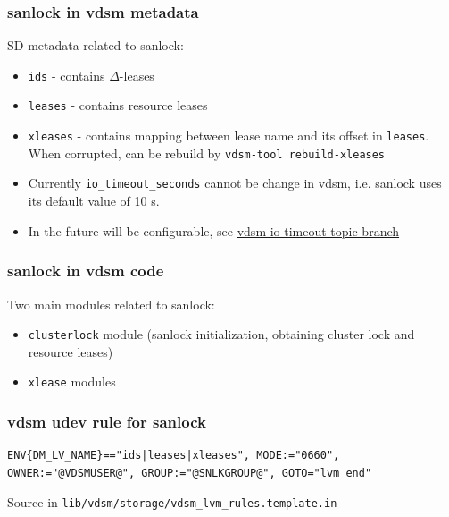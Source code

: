\documentclass[10pt,utf8]{beamer}
\begin{document}
\begin{frame}
    \frametitle{sanlock in vdsm metadata}
    SD metadata related to sanlock:
    \begin{itemize}
        \item \texttt{ids} - contains $\Delta$-leases
        \item \texttt{leases} - contains resource leases
        \item \texttt{xleases} - contains mapping between lease name and its offset in \texttt{leases}. When corrupted, can be rebuild by \texttt{vdsm-tool rebuild-xleases}
        \item Currently \texttt{io\_timeout\_seconds} cannot be change in vdsm, i.e. sanlock uses its default value of 10 s.
        \item In the future will be configurable, see \color{blue}\href{https://gerrit.ovirt.org/\#/q/project:vdsm+branch:master+topic:io-timeout}{vdsm io-timeout topic branch}\color{black}
    \end{itemize}
\end{frame}

\begin{frame}
  \frametitle{sanlock in vdsm code}
  Two main modules related to sanlock:
    \begin{itemize}
        \item \texttt{clusterlock} module (sanlock initialization, obtaining cluster lock and resource leases)
        \item \texttt{xlease} modules
    \end{itemize}
\end{frame}

\begin{frame}[fragile]
    \frametitle{vdsm udev rule for sanlock}
    \begin{lstlisting}[style=bash]
ENV{DM_LV_NAME}=="ids|leases|xleases", MODE:="0660", OWNER:="@VDSMUSER@", GROUP:="@SNLKGROUP@", GOTO="lvm_end"
    \end{lstlisting}
    Source in \texttt{lib/vdsm/storage/vdsm\_lvm\_rules.template.in}
\end{frame}
\end{document}
